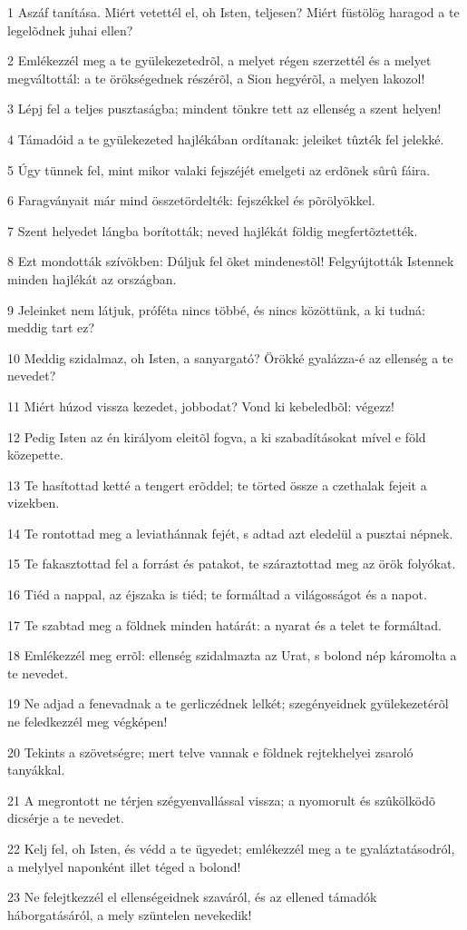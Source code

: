 \par 1 Aszáf tanítása. Miért vetettél el, oh Isten, teljesen? Miért füstölög haragod a te legelõdnek juhai ellen?
\par 2 Emlékezzél meg a te gyülekezetedrõl, a melyet régen szerzettél és a melyet megváltottál: a te örökségednek részérõl, a Sion hegyérõl, a melyen lakozol!
\par 3 Lépj fel a teljes pusztaságba; mindent tönkre tett az ellenség a szent helyen!
\par 4 Támadóid a te gyülekezeted hajlékában ordítanak: jeleiket tûzték fel jelekké.
\par 5 Úgy tünnek fel, mint mikor valaki fejszéjét emelgeti az erdõnek sûrû fáira.
\par 6 Faragványait már mind összetördelték: fejszékkel és põrölyökkel.
\par 7 Szent helyedet lángba borították; neved hajlékát földig megfertõztették.
\par 8 Ezt mondották szívökben: Dúljuk fel õket mindenestõl! Felgyújtották Istennek minden hajlékát az országban.
\par 9 Jeleinket nem látjuk, próféta nincs többé, és nincs közöttünk, a ki tudná: meddig tart ez?
\par 10 Meddig szidalmaz, oh Isten, a sanyargató? Örökké gyalázza-é az ellenség a te nevedet?
\par 11 Miért húzod vissza kezedet, jobbodat? Vond ki kebeledbõl: végezz!
\par 12 Pedig Isten az én királyom eleitõl fogva, a ki szabadításokat mível e föld közepette.
\par 13 Te hasítottad ketté a tengert erõddel; te törted össze a czethalak fejeit a vizekben.
\par 14 Te rontottad meg a leviathánnak fejét, s adtad azt eledelül a pusztai népnek.
\par 15 Te fakasztottad fel a forrást és patakot, te száraztottad meg az örök folyókat.
\par 16 Tiéd a nappal, az éjszaka is tiéd; te formáltad a világosságot és a napot.
\par 17 Te szabtad meg a földnek minden határát: a nyarat és a telet te formáltad.
\par 18 Emlékezzél meg errõl: ellenség szidalmazta az Urat, s bolond nép káromolta a te nevedet.
\par 19 Ne adjad a fenevadnak a te gerliczédnek lelkét; szegényeidnek gyülekezetérõl ne feledkezzél meg végképen!
\par 20 Tekints a szövetségre; mert telve vannak e földnek rejtekhelyei zsaroló tanyákkal.
\par 21 A megrontott ne térjen szégyenvallással vissza; a nyomorult és szûkölködõ dicsérje a te nevedet.
\par 22 Kelj fel, oh Isten, és védd a te ügyedet; emlékezzél meg a te gyaláztatásodról, a melylyel naponként illet téged a bolond!
\par 23 Ne felejtkezzél el ellenségeidnek szaváról, és az ellened támadók háborgatásáról, a mely szüntelen nevekedik!

